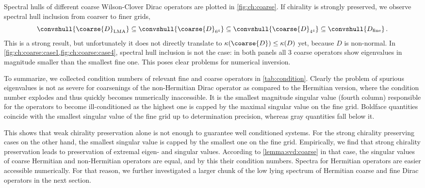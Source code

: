 Spectral hulls of different coarse Wilson-Clover Dirac operators are plotted in \cref{fig:ch:coarse}.
If chirality is strongly preserved, we observe spectral hull inclusion from coarser to finer grids,
\begin{equation}
\convshull{\coarse{D}_{\text{LMA}}} \subseteq
\convshull{\coarse{D}_{6^{4}}} \subseteq
\convshull{\coarse{D}_{4^{4}}} \subseteq
\convshull{D_{\text{fine}}} \,.
\end{equation}
This is a strong result, but unfortunately it does not directly translate to $\kappa(\coarse{D}) \leq \kappa(D)$ yet, because $D$ is non-normal.
In \cref{fig:ch:coarse:case1,fig:ch:coarse:case4}, spectral hull inclusion is not the case: in both panels all \num{3} coarse operators show eigenvalues in magnitude smaller than the smallest fine one.
This poses clear problems for numerical inversion.

To summarize, we collected condition numbers of relevant fine and coarse operators in \cref{tab:condition}.
Clearly the problem of spurious eigenvalues is not as severe for coarsenings of the non-Hermitian Dirac operator as compared to the Hermitian version, where the condition number explodes and thus quickly becomes numerically inaccessible.
It is the smallest magnitude singular value (fourth column) responsible for the operators to become ill-conditioned as the highest one is capped by the maximal singular value on the fine grid.
Boldface quantities coincide with the smallest singular value of the fine grid up to determination precision, whereas gray quantities fall below it.

This shows that weak chirality preservation alone is not enough to guarantee well conditioned systems.
For the strong chirality preserving cases on the other hand, the smallest singular value is capped by the smallest one on the fine grid.
Empirically, we find that strong chirality preservation leads to preservation of extremal eigen- and singular values.
According to \cref{lemma:svd:coarse} in that case, the singular values of coarse Hermitian and non-Hermitian operators are equal, and by this their condition numbers.
Spectra for Hermitian operators are easier accessible numerically.
For that reason, we further investigated a larger chunk of the low lying spectrum of Hermitian coarse and fine Dirac operators in the next section.

